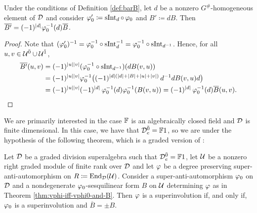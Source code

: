 \begin{lemma}\label{lemma:bar-dB}
    Under the conditions of Definition \ref{def:barB}, let $d$ be a nonzero $G^\#$-homogeneous element of $\mathcal{D}$ and consider $\varphi_0' \coloneqq \operatorname{sInt}_d\circ\, \varphi_0$ and $B' \coloneqq d B$. 
    Then $\overline {B'} = (-1)^{|d|} \varphi_0^{-1} (d) \overline B$.
\end{lemma}

\begin{proof}
    Note that $(\varphi_0')^{-1} = \varphi_0^{-1} \circ \operatorname{sInt}_{d}^{-1} = \varphi_0^{-1} \circ \operatorname{sInt}_{d^{-1}}$. 
    Hence, for all $u, v \in \mathcal U^{\bar0} \cup \mathcal U^{\bar1}$,
    \begin{align*}
        \overline {B'} (u,v) &= (-1)^{|u||v|} (\varphi_0^{-1} \circ \operatorname{sInt}_{d^{-1}})  (d B(v, u) ) \\
        &= (-1)^{|u||v|} \varphi_0^{-1} \big( (-1)^{|d| (|d| + |B| + |u| + |v|)}\,  d^{-1} d B (v, u) d \big) \\ &= (-1)^{|u||v|} (-1)^{|d|}\, \varphi_0^{-1} (d) \varphi_0^{-1}(B(v, u)) =  (-1)^{|d|}\,\varphi_0^{-1} (d) \overline {B} (u, v).
    \end{align*}
\end{proof}

We are primarily interested in the case $\mathbb{F}$ is an algebraically closed field and $\mathcal{D}$ is finite dimensional. 
In this case, we have that $\mathcal{D}^{\bar0}_e = \mathbb{F} 1$, so we are under the hypothesis of the following theorem, which is a graded version of \cite[Theorem 7]{racine}:

\begin{thm}\label{thm:vphi-involution-iff-delta-pm-1}
    Let $\mathcal{D}$ be a graded division superalgebra such that $\mathcal{D}^{\bar0}_e = \mathbb{F} 1$, let $\mathcal U$ be a nonzero right graded module of finite rank over $\mathcal{D}$ and let $\varphi$ be a degree preserving super-anti-automorphism on $R \coloneqq \operatorname{End}_{\mathcal{D}} (\mathcal U)$. 
    Consider a super-anti-automorphism $\varphi_0$ on $\mathcal{D}$ and a nondegenerate $\varphi_0$-sesqui\-li\-near form $B$ on $\mathcal U$ determining $\varphi$ as in Theorem \ref{thm:vphi-iff-vphi0-and-B}.
    Then $\varphi$ is a superinvolution if, and only if, $\varphi_0$ is a superinvolution and $\overline B = \pm B$. 
\end{thm}

